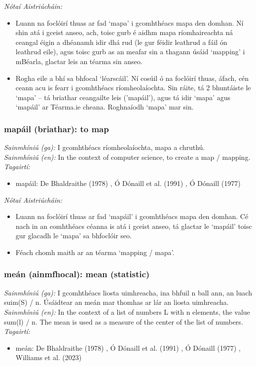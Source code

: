  \noindent \textit{Nótaí Aistriúcháin:}
\begin{itemize}
	\item Luann na foclóirí thuas ar fad `mapa' i gcomhthéacs mapa den domhan. Ní shin atá i gceist anseo, ach, toisc gurb é aidhm mapa ríomhaireachta ná ceangal éigin a dhéanamh idir dhá rud (le gur féidir leathrud a fáil ón leathrud eile), agus toisc gurb as an meafar sin a thagann úsáid `mapping' i mBéarla, glactar leis an téarma sin anseo.
	\item Rogha eile a bhí sa bhfocal `léarscáil'. Ní cosúil ó na foclóirí thuas, áfach, cén ceann acu is fearr i gcomhthéacs ríomheolaíochta. Sin ráite, tá 2 bhuntáiste le `mapa' -- tá briathar ceangailte leis ('mapáil'), agus tá idir `mapa' agus `mapáil' ar Téarma.ie cheana. Roghnaíodh `mapa' mar sin.
\end{itemize}


\subsubsection*{mapáil (briathar): to map}
 \noindent \textit{Sainmhíniú (ga):} I gcomhthéacs ríomheolaíochta, mapa a chruthú.
\\
 \noindent \textit{Sainmhíniú (en):} In the context of computer science, to create a map / mapping.
\\
 \noindent \textit{Tagairtí:}
\begin{itemize}
	\item mapáil: De Bhaldraithe (1978) \cite{de-bhaldraithe}, Ó Dónaill et al. (1991) \cite{focloir-beag}, Ó Dónaill (1977) \cite{odonaill}
\end{itemize}

 \noindent \textit{Nótaí Aistriúcháin:}
\begin{itemize}
	\item Luann na foclóirí thuas ar fad `mapáil' i gcomhthéacs mapa den domhan. Cé nach in an comhthéacs céanna is atá i gceist anseo, tá glactar le `mapáil' toisc gur glacadh le `mapa' sa bhfoclóir seo.
	\item Féach chomh maith ar an téarma `mapping / mapa'.
\end{itemize}


\subsubsection*{meán (ainmfhocal): mean (statistic)}
 \noindent \textit{Sainmhíniú (ga):} I gcomhthéacs liosta uimhreacha, ina bhfuil n ball ann, an luach suim(S) / n. Úsáidtear an meán mar thomhas ar lár an liosta uimhreacha.
\\
 \noindent \textit{Sainmhíniú (en):} In the context of a list of numbers L with n elements, the value sum(l) / n. The mean is used as a measure of the center of the list of numbers.
\\
 \noindent \textit{Tagairtí:}
\begin{itemize}
	\item meán: De Bhaldraithe (1978) \cite{de-bhaldraithe}, Ó Dónaill et al. (1991) \cite{focloir-beag}, Ó Dónaill (1977) \cite{odonaill}, Williams et al. (2023) \cite{storchiste}
\end{itemize}

